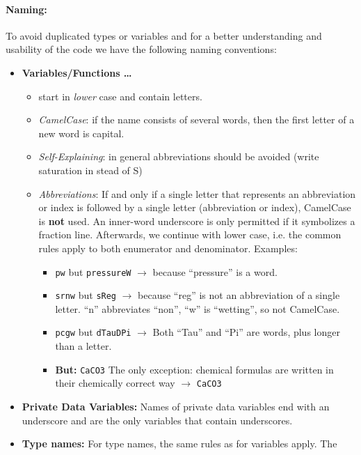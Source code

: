 \paragraph{Naming:}
To avoid duplicated types or variables and for a better understanding and usability
of the code we have the following naming conventions:
\begin{itemize}
\item \textbf{Variables/Functions \ldots}
  \begin{itemize}
  \item start in \emph{lower} case and contain letters.
  \item \emph{CamelCase}: if the name consists of  several words, then
        the first letter of a new word is capital.
  \item \emph{Self-Explaining}: in general abbreviations should be avoided (write saturation in stead of S)
  \item \emph{Abbreviations}: If and only if a single letter that represents an
         abbreviation or index is followed by a single letter (abbreviation or index),
         CamelCase is {\bf not} used. An inner-word underscore is only permitted if
         it symbolizes a fraction line. Afterwards, we continue with lower case, i.e.
         the common rules apply to both enumerator and denominator. Examples:
  \begin{itemize}
      \item \texttt{pw} but \texttt{pressureW} $\rightarrow$ because ``pressure'' is a word.
      \item \texttt{srnw} but \texttt{sReg} $\rightarrow$ because ``reg'' is not an
            abbreviation of a single letter. ``n'' abbreviates ``non'',
             ``w'' is ``wetting'', so not CamelCase.
      \item \texttt{pcgw} but \texttt{dTauDPi} $\rightarrow$ Both ``Tau'' and ``Pi''
            are words, plus longer than a letter.
      \item \textbf{But:} \texttt{CaCO3} The only exception: chemical formulas are
            written in their chemically correct way $\rightarrow$ \texttt{CaCO3}
  \end{itemize}
  \end{itemize}
\item \textbf{Private Data Variables:} Names of private data variables end with an
      underscore and are the only variables that contain underscores.
\item \textbf{Type names:} For type names, the same rules as for variables apply. The

\end{itemize}
